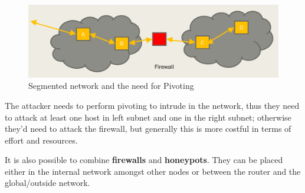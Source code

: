 \begin{figure}[htbp]
   \centering
   \includegraphics{images/pivoting.png}
   \caption{Segmented network and the need for Pivoting}
   \label{fig:pivoting}
\end{figure}

The attacker needs to perform pivoting to intrude in the network, thus they need to attack at least one host in left subnet and one in the right subnet;
otherwise they'd need to attack the firewall, but generally this is more costful in terms of effort and resources.

It is also possible to combine \textbf{firewalls} and \textbf{honeypots}.
They can be placed either in the internal network amongst other nodes or between the router and the global/outside network.